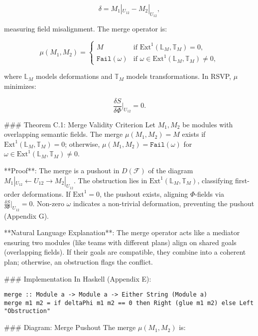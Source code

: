 \documentclass[12pt]{article}
\begin{document}
{\[
\delta = M_1|_{U_{12}} - M_2|_{U_{12}},
\]

measuring field misalignment. The merge operator is:

\[
\mu(M_1, M_2) = \begin{cases} 
M & \text{if } \mathrm{Ext}^1(\mathbb{L}_M, \mathbb{T}_M) = 0, \\
\texttt{Fail}(\omega) & \text{if } \omega \in \mathrm{Ext}^1(\mathbb{L}_M, \mathbb{T}_M) \neq 0,
\end{cases}
\]

where $\mathbb{L}_M$ models deformations and $\mathbb{T}_M$ models transformations. In RSVP, $\mu$ minimizes:

\[
\frac{\delta S}{\delta \Phi}|_{U_{12}} = 0.
\]

### Theorem C.1: Merge Validity Criterion
Let $M_1, M_2$ be modules with overlapping semantic fields. The merge $\mu(M_1, M_2) = M$ exists if $\mathrm{Ext}^1(\mathbb{L}_M, \mathbb{T}_M) = 0$; otherwise, $\mu(M_1, M_2) = \texttt{Fail}(\omega)$ for $\omega \in \mathrm{Ext}^1(\mathbb{L}_M, \mathbb{T}_M) \neq 0$.

**Proof**: The merge is a pushout in $D(\mathcal{F})$ of the diagram $M_1|_{U_{12}} \leftarrow U_{12} \to M_2|_{U_{12}}$. The obstruction lies in $\mathrm{Ext}^1(\mathbb{L}_M, \mathbb{T}_M)$, classifying first-order deformations. If $\mathrm{Ext}^1 = 0$, the pushout exists, aligning $\Phi$-fields via $\frac{\delta S}{\delta \Phi}|_{U_{12}} = 0$. Non-zero $\omega$ indicates a non-trivial deformation, preventing the pushout \cite{illusie1971complexe} (Appendix G).

**Natural Language Explanation**: The merge operator acts like a mediator ensuring two modules (like teams with different plans) align on shared goals (overlapping fields). If their goals are compatible, they combine into a coherent plan; otherwise, an obstruction flags the conflict.

### Implementation
In Haskell (Appendix E):

\begin{lstlisting}
merge :: Module a -> Module a -> Either String (Module a)
merge m1 m2 = if deltaPhi m1 m2 == 0 then Right (glue m1 m2) else Left "Obstruction"
\end{lstlisting}

### Diagram: Merge Pushout
The merge $\mu(M_1, M_2)$ is:

\begin{center}
\end{center}

}
\end{document}
